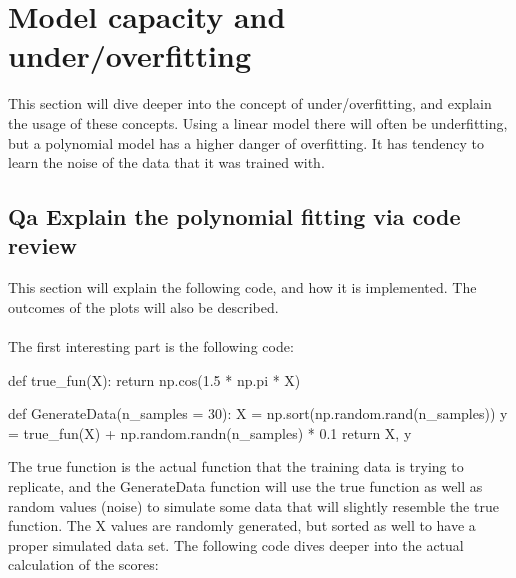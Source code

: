 \documentclass{article}
\begin{document}
\section{Model capacity and under/overfitting}

This section will dive deeper into the concept of under/overfitting, and explain the usage of these concepts. Using a linear model there will often be underfitting, but a polynomial model has a higher danger of overfitting. It has tendency to learn the noise of the data that it was trained with.


\subsection{Qa Explain the polynomial fitting via code review}

This section will explain the following code, and how it is implemented. The outcomes of the plots will also be described. 
\\ \\

The first interesting part is the following code:

\begin{pyminted}
def true_fun(X):
    return np.cos(1.5 * np.pi * X)

def GenerateData(n_samples = 30):
    X = np.sort(np.random.rand(n_samples))
    y = true_fun(X) + np.random.randn(n_samples) * 0.1
    return X, y
\end{pyminted}

The true function is  the actual function that the training data is trying to replicate, and the GenerateData function will use the true function as well as random values (noise) to simulate some data that will slightly resemble the true function. The X values are randomly generated, but sorted as well to have a proper simulated data set. 
\noindent
The following code dives deeper into the actual calculation of the scores:
\end{document}
